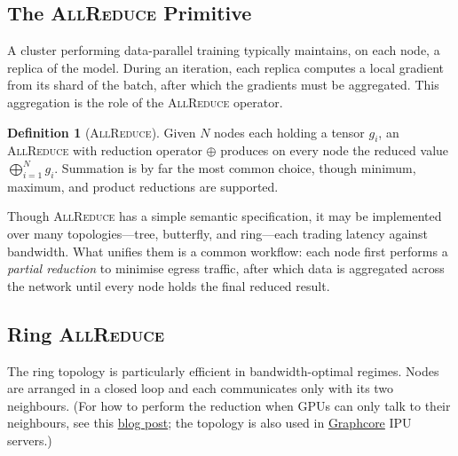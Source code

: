 \documentclass[11pt,a4paper]{article}
\theoremstyle{definition}
\newtheorem{definition}{Definition}[section]
\theoremstyle{remark}
\theoremstyle{plain}
\begin{document}
\subsection{The \textsc{AllReduce} Primitive}

A cluster performing data-parallel training typically maintains, on each
node, a replica of the model. During an iteration, each replica computes a
local gradient from its shard of the batch, after which the gradients must
be aggregated. This aggregation is the role of the \textsc{AllReduce}
operator.

\begin{definition}[\textsc{AllReduce}]
Given $N$ nodes each holding a tensor $g_i$, an \textsc{AllReduce} with
reduction operator $\oplus$ produces on every node the reduced value
$\bigoplus_{i=1}^{N} g_i$. Summation is by far the most common choice,
though minimum, maximum, and product reductions are supported.
\end{definition}

Though \textsc{AllReduce} has a simple semantic specification, it may be
implemented over many topologies---tree, butterfly, and ring---each
trading latency against bandwidth. What unifies them is a common
workflow: each node first performs a \emph{partial reduction} to minimise
egress traffic, after which data is aggregated across the network until
every node holds the final reduced result.

\subsection{Ring \textsc{AllReduce}}

The ring topology is particularly efficient in bandwidth-optimal regimes.
Nodes are arranged in a closed loop and each communicates only with its
two neighbours. (For how to perform the reduction when GPUs can only talk to their
neighbours, see this
\href{https://tinyurl.com/ring-allreduce-blog}{blog post}; the topology
is also used in \href{https://www.graphcore.ai/}{Graphcore} IPU servers.)

\begin{center}
\end{center}
\end{document}

